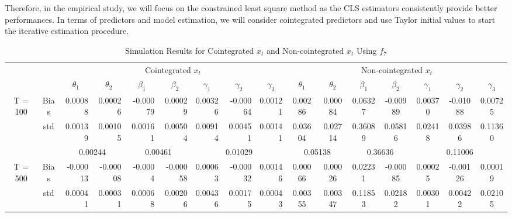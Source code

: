 \documentclass[a4paper,12pt,times,numbered,print,index]{report}
\numberwithin{equation}{section}
\begin{document}
Therefore, in the empirical study, we will focus on the constrained least square method as the CLS estimators consistently provide better performances. In terms of predictors and model estimation, we will consider cointegrated predictors and use Taylor initial values to start the iterative estimation procedure.
\begin{table}[htbp]
	\centering
	\caption{Simulation Results for Cointegrated $x_t$ and Non-cointegrated $x_t$ Using $f_7$}
	\begin{adjustbox}{max width=\textwidth}
	\begin{tabular}{cccccccccccccccc}
		\toprule
		&       & \multicolumn{7}{c}{Cointegrated $x_t$}                               & \multicolumn{7}{c}{Non-cointegrated $x_t$} \\
		&       & $\theta_1$ & $\theta_2$ & $\beta_1$ & $\beta_2$ & $\gamma_1$ & $\gamma_2$ & $\gamma_3$ & $\theta_1$ & $\theta_2$ & $\beta_1$ & $\beta_2$ & $\gamma_1$ & $\gamma_2$ & $\gamma_3$ \\
		\midrule
		\multirow{3}[1]{*}{T = 100} & Bias  & \multicolumn{1}{r}{\textcolor[rgb]{ 0,  .439,  .753}{0.00088}} & \multicolumn{1}{r}{0.00026} & \multicolumn{1}{r}{-0.00079} & \multicolumn{1}{r}{0.00029} & \multicolumn{1}{r}{0.00326} & \multicolumn{1}{r}{-0.00064} & \multicolumn{1}{r}{0.00121} & \textcolor[rgb]{ 0,  .439,  .753}{0.00286} & 0.00084 & 0.06327 & -0.00989 & 0.00370 & -0.01088 & 0.00725 \\
		& std   & \multicolumn{1}{r}{0.00139} & \multicolumn{1}{r}{0.00105} & \multicolumn{1}{r}{0.00161} & \multicolumn{1}{r}{0.00504} & \multicolumn{1}{r}{0.00914} & \multicolumn{1}{r}{0.00451} & \multicolumn{1}{r}{0.00141} & 0.03604 & 0.02714 & 0.36089 & 0.05816 & 0.02418 & 0.03986 & 0.11360 \\
		&       & \multicolumn{2}{c}{0.00244} & \multicolumn{2}{c}{0.00461} & \multicolumn{3}{c}{0.01029} & \multicolumn{2}{c}{0.05138} & \multicolumn{2}{c}{0.36636} & \multicolumn{3}{c}{0.11006} \\
		\multirow{3}[0]{*}{T = 500} & Bias  & \multicolumn{1}{r}{\textcolor[rgb]{ 0,  .439,  .753}{-0.00013}} & \multicolumn{1}{r}{-0.00008} & \multicolumn{1}{r}{-0.0004} & \multicolumn{1}{r}{-0.00058} & \multicolumn{1}{r}{0.00063} & \multicolumn{1}{r}{-0.00032} & \multicolumn{1}{r}{0.00146} & \textcolor[rgb]{ 0,  .439,  .753}{0.00066} & 0.00026 & 0.02231 & -0.00085 & 0.00025 & -0.00126 & 0.00019 \\
		& std   & \multicolumn{1}{r}{0.00041} & \multicolumn{1}{r}{0.00031} & \multicolumn{1}{r}{0.00068} & \multicolumn{1}{r}{0.00206} & \multicolumn{1}{r}{0.00436} & \multicolumn{1}{r}{0.00175} & \multicolumn{1}{r}{0.00043} & 0.00355 & 0.00347 & 0.11853 & 0.02182 & 0.00301 & 0.00422 & 0.02105 \\

\end{tabular}
\end{adjustbox}
\end{table}
\end{document}
